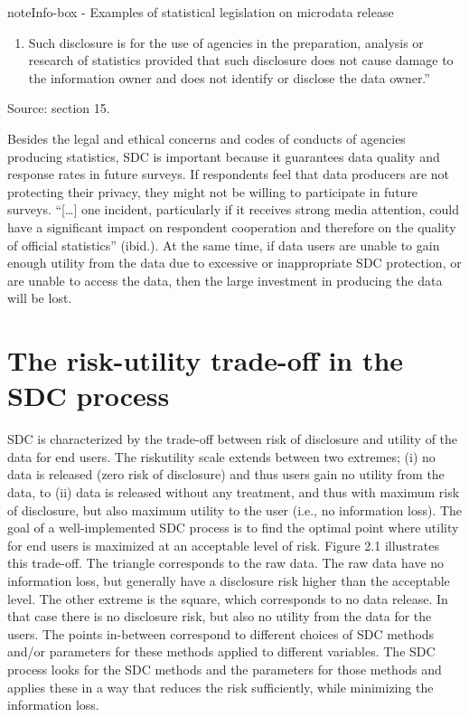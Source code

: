 \documentclass[letterpaper,10pt,english]{sphinxmanual}
\begin{document}
\begin{sphinxadmonition}{note}{Info-box - Examples of statistical legislation on microdata release}
\begin{enumerate}
\begin{enumerate}
\item {} 
Such disclosure is for the use of agencies in the preparation, analysis or research of statistics provided that such disclosure does not cause damage to the information owner and does not identify or disclose the data owner.”

\end{enumerate}

\end{enumerate}

Source:  section 15.
\end{sphinxadmonition}

Besides the legal and ethical concerns and codes of conducts of agencies
producing statistics, SDC is important because it guarantees data
quality and response rates in future surveys. If respondents feel that
data producers are not protecting their privacy, they might not be
willing to participate in future surveys. “{[}…{]} one incident,
particularly if it receives strong media attention, could have a
significant impact on respondent cooperation and therefore on the
quality of official statistics” (ibid.). At the same time, if data users
are unable to gain enough utility from the data due to excessive or
inappropriate SDC protection, or are unable to access the data, then the
large investment in producing the data will be lost.


\section{The risk-utility trade-off in the SDC process}
\label{\detokenize{SDC_intro:the-risk-utility-trade-off-in-the-sdc-process}}
SDC is characterized by the trade-off between risk of disclosure and
utility of the data for end users. The risk\textendash{}utility scale extends
between two extremes; (i) no data is released (zero risk of disclosure)
and thus users gain no utility from the data, to (ii) data is released
without any treatment, and thus with maximum risk of disclosure, but
also maximum utility to the user (i.e., no information loss). The goal
of a well-implemented SDC process is to find the optimal point where
utility for end users is maximized at an acceptable level of risk.
Figure 2.1 illustrates this trade-off. The triangle corresponds to the
raw data. The raw data have no information loss, but generally have a
disclosure risk higher than the acceptable level. The other extreme is
the square, which corresponds to no data release. In that case there is
no disclosure risk, but also no utility from the data for the users. The
points in-between correspond to different choices of SDC methods and/or
parameters for these methods applied to different variables. The SDC
process looks for the SDC methods and the parameters for those methods
and applies these in a way that reduces the risk sufficiently, while
minimizing the information loss.
\end{document}
